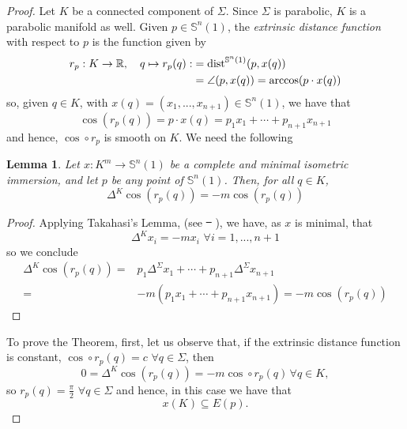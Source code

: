 \documentclass{amsart}
\newtheorem{lemma}[theorem]{Lemma}
\theoremstyle{definition}
\theoremstyle{remark}
\providecommand{\DIFadd}[1]{{\protect\color{blue}\uwave{#1}}} %
\providecommand{\DIFdel}[1]{{\protect\color{red}\sout{#1}}}                      %
\providecommand{\DIFaddbegin}{} %
\providecommand{\DIFaddend}{} %
\providecommand{\DIFdelbegin}{} %
\providecommand{\DIFdelend}{} %
\begin{document}
\begin{proof}
Let $K$ be a connected component of $\Sigma$. Since $\Sigma$ is parabolic, $K$ is a parabolic manifold as well.
Given $p\in \mathbb{S}^n(1)$, the \emph{extrinsic distance function} with respect to $p$ is the function given by
$$
\begin{aligned}
r_p:K \to \mathbb{R}, \quad q\mapsto r_p(q):&={\rm dist}^{\mathbb{S}^n(1)}(p,x(q))\\&=\angle{(p,x(q))}=\arccos(p\cdot x(q))
\end{aligned}
$$
so, given $q \in K$, with $x(q)=(x_1,...,x_{n+1}) \in \mathbb{S}^n(1)$, we have that
$$
\cos(r_p(q))=p\cdot x(q) = p_1x_1+\cdots+p_{n+1}x_{n+1}
$$
 and hence, $\cos\circ r_p$ is smooth on $K$.   We need the following
\begin{lemma}\label{coslema}
Let $x:K^m \to \mathbb{S}^n(1)$ be a complete and minimal isometric immersion, and let $p$ be any point of $\mathbb{S}^n(1)$. Then, for all $q \in K$,
 \begin{equation}\label{cos}
\Delta^K \cos(r_p(q))=-m\cos(r_p(q))
\end{equation}
\end{lemma}
\begin{proof}
  Applying Takahasi's Lemma, (see \DIFdelbegin \DIFdel{\mbox{%
\cite{Tak}}\hskip0pt%
}\DIFdelend \DIFaddbegin \DIFadd{\mbox{%
\cite{T}}\hskip0pt%
}\DIFaddend ), we have,  as $x$ is minimal, that 
  $$\Delta^K x_i=-m x_i\,\,\forall i=1,...,n+1$$
  so we conclude 
$$
\begin{aligned}
\Delta^K \cos(r_p(q))=&p_1\Delta^\Sigma x_1+\cdots+p_{n+1}\Delta^\Sigma x_{n+1}\\=&-m\left(p_1x_1+\cdots+p_{n+1}x_{n+1}\right)=-m\cos(r_p(q))
\end{aligned}
$$\end{proof}
To prove  the Theorem, first, let us observe that, if the extrinsic distance function is constant,
$\cos\circ r_p(q)=c \,\,\forall q \in \Sigma$, then 
$$0=\Delta^K \cos(r_p(q))=-m\cos\circ r_p(q)\,\forall q \in K,$$
so $r_p(q)=\frac{\pi}{2} \,\,\forall q \in \Sigma$ and hence, in this case we have that $$x(K) \subseteq E(p).$$


\end{proof}
\end{document}
